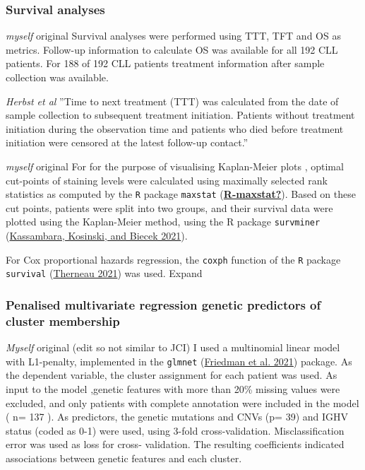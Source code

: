 \documentclass[11pt, a4paper, twosided]{book}
\begin{document}
\hypertarget{survival-analyses}{%
\subsubsection{Survival analyses}\label{survival-analyses}}

\emph{myself} original
Survival analyses were performed using TTT, TFT and OS as metrics. Follow-up information to calculate OS was available for all 192 CLL patients. For 188 of 192 CLL patients treatment information after sample collection was available.

\emph{Herbst et al}
''Time to next treatment (TTT) was calculated from the date of sample collection to subsequent
treatment initiation. Patients without treatment initiation during the observation time and
patients who died before treatment initiation were censored at the latest follow-up contact.''

\emph{myself} original
For for the purpose of visualising Kaplan-Meier plots , optimal cut-points of staining levels were calculated using maximally selected rank statistics as computed by the \texttt{R} package \texttt{maxstat} (\protect\hyperlink{ref-R-maxstat}{\textbf{R-maxstat?}}). Based on these cut points, patients were split into two groups, and their survival data were plotted using the Kaplan-Meier method, using the R package \texttt{survminer} (\protect\hyperlink{ref-R-survminer}{Kassambara, Kosinski, and Biecek 2021}).

For Cox proportional hazards regression, the \texttt{coxph} function of the \texttt{R} package \texttt{survival} (\protect\hyperlink{ref-R-survival}{Therneau 2021}) was used. Expand

\hypertarget{penalised-multivariate-regression-genetic-predictors-of-cluster-membership}{%
\subsubsection{Penalised multivariate regression genetic predictors of cluster membership}\label{penalised-multivariate-regression-genetic-predictors-of-cluster-membership}}

\emph{Myself} original (edit so not similar to JCI)
I used a multinomial linear model with L1-penalty, implemented in the \texttt{glmnet} (\protect\hyperlink{ref-R-glmnet}{Friedman et al. 2021}) package. As the dependent variable, the cluster assignment for each patient was used. As input to the model ,genetic features with more than 20\% missing values were excluded, and only patients with complete annotation were included in the model ( n= 137 ). As predictors, the genetic mutations and CNVs (p= 39) and IGHV status (coded as 0-1) were used, using 3-fold cross-validation. Misclassification error was used as loss for cross- validation. The resulting coefficients indicated associations between genetic features and each cluster.
\end{document}
